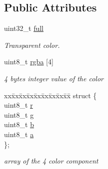 \subsection*{Public Attributes}
\begin{DoxyCompactItemize}
\item 
uint32\+\_\+t \hyperlink{unionarcade_1_1_color_ad68cc4b72cafa2c89dac97a336d1ca32}{full}
\begin{DoxyCompactList}\small\item\em Transparent color. \end{DoxyCompactList}\item 
uint8\+\_\+t \hyperlink{unionarcade_1_1_color_a805bb231543d607ee00f353506c850be}{rgba} \mbox{[}4\mbox{]}
\begin{DoxyCompactList}\small\item\em 4 bytes integer value of the color \end{DoxyCompactList}\item 
\begin{tabbing}
xx\=xx\=xx\=xx\=xx\=xx\=xx\=xx\=xx\=\kill
struct \{\\
\>uint8\_t \hyperlink{unionarcade_1_1_color_a20637c0cb142a384bd034cceacafe6e0}{r}\\
\>uint8\_t \hyperlink{unionarcade_1_1_color_a97c509df99c9b119622f4b2ff8b3f21b}{g}\\
\>uint8\_t \hyperlink{unionarcade_1_1_color_a7edec98cabcfdeb71ae750e7442a6baf}{b}\\
\>uint8\_t \hyperlink{unionarcade_1_1_color_ae2f888f27d844d24f9ef10917f42d2dc}{a}\\
\}; \\

\end{tabbing}\begin{DoxyCompactList}\small\item\em array of the 4 color component \end{DoxyCompactList}\end{DoxyCompactItemize}
